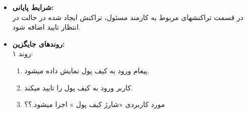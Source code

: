 \documentclass{article}
\begin{document}
\begin{itemize}
\item \textbf{شرایط پایانی:}\\ 
در قسمت تراکنشهای مربوط به کارمند مسئول، تراکنش ایجاد شده در حالت در انتظار تایید اضافه شود.
\item \textbf{روندهای جایگزین:}\\
روند ۱:\\
\begin{enumerate}
\item پیغام ورود به کیف پول نمایش داده میشود.
\item کاربر ورود به کیف پول را تایید میکند.
\item مورد کاربردی «شارژ کیف پول » اجرا میشود.؟؟
\end{enumerate}

\end{itemize}


\noindent\makebox[\linewidth]{\rule{\paperwidth}{0.4pt}}
\end{document}
